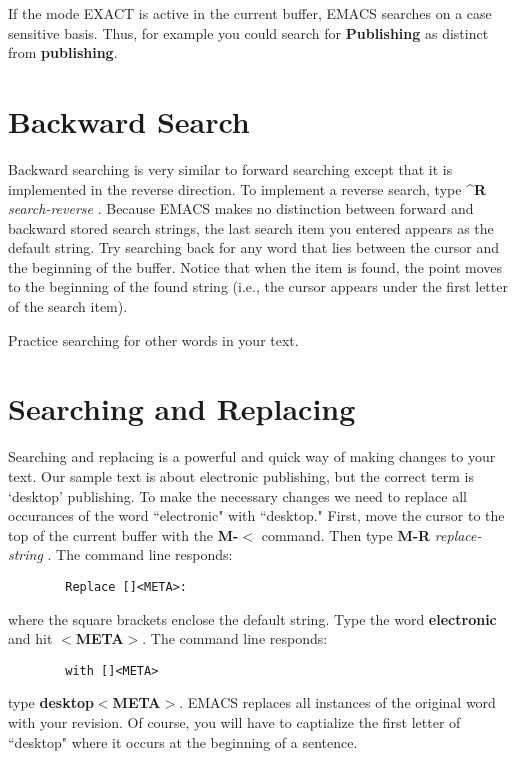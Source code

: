If the mode EXACT is active in the current buffer, EMACS searches on a case
sensitive basis.  Thus, for example you could search for {\bf{}Publishing}
as distinct from {\bf{}publishing}.

\section{Backward Search}

Backward searching is very similar to forward searching except that it
is implemented in the reverse direction.  To implement a reverse
search, type {\bf{}\^{}R} {\it{}search-reverse}
.  Because EMACS makes no distinction between
forward and backward stored search strings, the last search item you
entered appears as the default string.  Try searching back for any
word that lies between the cursor and the beginning of the buffer.
Notice that when the item is found, the point moves to the beginning
of the found string (i.e., the cursor appears under the first letter
of the search item).

Practice searching for other words in your text.

\section{Searching and Replacing}

Searching and replacing is a powerful and quick way of making changes
to your text.  Our sample text is about electronic publishing, but the
correct term is `desktop' publishing.  To make the necessary changes
we need to replace all occurances of the word ``electronic" with
``desktop."  First, move the cursor to the top of the current buffer
with the {\bf{}M-$<${}} command.  Then type {\bf{}M-R}
{\it{}replace-string} .  The command line
responds:

\begin{verbatim}
        Replace []<META>:
\end{verbatim}

where the square brackets enclose the default string.  Type the word
{\bf{}electronic} and hit {\bf{}$<${}META$>${}}.  The command line responds:

\begin{verbatim}
        with []<META>
\end{verbatim}

type {\bf{}desktop$<${}META$>${}}.  EMACS replaces all instances of
the original word with your revision.  Of course, you will have to
captialize the first letter of ``desktop" where it occurs at the
beginning of a sentence.

